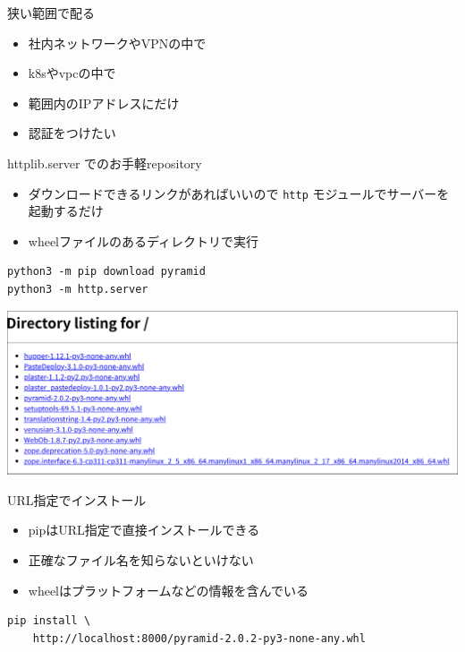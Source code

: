 \documentclass[presentation]{beamer}
\begin{document}
\begin{frame}[label={sec:org30b2d02}]{狭い範囲で配る}
\begin{itemize}
\item 社内ネットワークやVPNの中で
\item k8sやvpcの中で
\item 範囲内のIPアドレスにだけ
\item 認証をつけたい
\end{itemize}
\end{frame}

\begin{frame}[label={sec:orgc64ebb0},fragile]{httplib.server でのお手軽repository}
 \begin{itemize}
\item ダウンロードできるリンクがあればいいので \texttt{http} モジュールでサーバーを起動するだけ
\item wheelファイルのあるディレクトリで実行
\end{itemize}

\begin{verbatim}
python3 -m pip download pyramid
python3 -m http.server
\end{verbatim}

\begin{center}
\includegraphics[width=.9\linewidth]{./http-server-simple-repository.png}
\end{center}
\end{frame}

\begin{frame}[label={sec:org97bbcfa},fragile]{URL指定でインストール}
 \begin{itemize}
\item pipはURL指定で直接インストールできる
\item 正確なファイル名を知らないといけない
\item wheelはプラットフォームなどの情報を含んでいる
\end{itemize}

\begin{verbatim}
pip install \
    http://localhost:8000/pyramid-2.0.2-py3-none-any.whl
\end{verbatim}
\end{frame}
\end{document}
